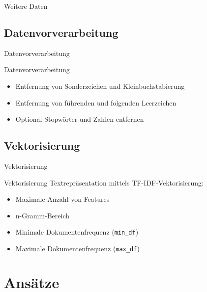 \documentclass[aspectratio=169]{beamer} %
\begin{document}
\begin{frame}{Weitere Daten}
    
\end{frame}

\subsection{Datenvorverarbeitung}

\begin{frame}{Datenvorverarbeitung}
    \begin{block}{Datenvorverarbeitung}
        \begin{itemize}
            \item Entfernung von Sonderzeichen und Kleinbuchstabierung
            \item Entfernung von führenden und folgenden Leerzeichen
            \item Optional Stopwörter und Zahlen entfernen
        \end{itemize}
    \end{block}
\end{frame}

\subsection{Vektorisierung}

\begin{frame}{Vektorisierung}
    \begin{block}{Vektorisierung}
        Textrepräsentation mittels TF-IDF-Vektorisierung:
        \begin{itemize}
            \item Maximale Anzahl von Features
            \item n-Gramm-Bereich
            \item Minimale Dokumentenfrequenz (\texttt{min\_df})
            \item Maximale Dokumentenfrequenz (\texttt{max\_df})
        \end{itemize}
    \end{block}
\end{frame}

\section{Ansätze}
\end{document}
